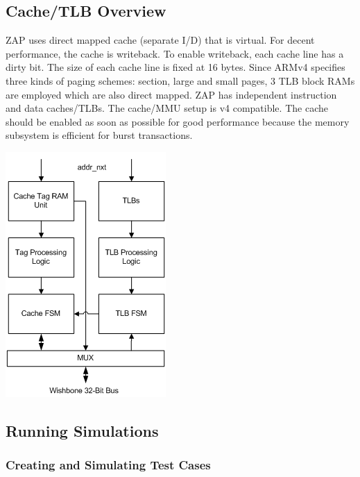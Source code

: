 \documentclass[10pt]{article}
\begin{document}
\subsection{Cache/TLB Overview}

ZAP uses direct mapped cache (separate I/D) that is virtual. For decent 
performance, the cache is writeback. To enable writeback, each cache line has 
a dirty bit. The size of each cache line is fixed at 16 bytes. Since ARMv4 
specifies three kinds of paging schemes: section, large and small pages, 3 
TLB block RAMs are employed which are also direct mapped. ZAP has independent 
instruction and data caches/TLBs. The cache/MMU setup is v4 compatible. The 
cache should be enabled as soon as possible for good performance because the 
memory subsystem is efficient for burst transactions.

\includegraphics{images/image012.png}

\subsection{Running Simulations}
\subsubsection{Creating and Simulating Test Cases}
\end{document}
